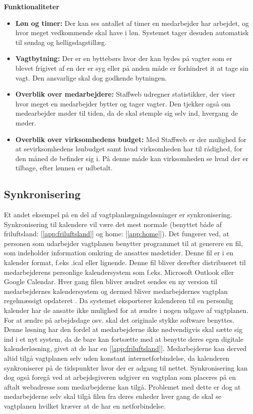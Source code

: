 \textbf{Funktionaliteter} 
\begin{itemize}
    \item {\textbf{Løn og timer:} Der kan ses antallet af timer en medarbejder har arbejdet, og hvor meget vedkommende skal have i løn. Systemet tager desuden automatisk til søndag og helligsdagstillæg.}
    \item {\textbf{Vagtbytning:} Der er en byttebørs hvor der kan bydes på vagter som er blevet frigivet af en der er syg eller på anden måde er forhindret it at tage sin vagt. Den ansvarlige skal dog godkende bytningen.}
    \item {\textbf{Overblik over medarbejdere:} Staffweb udregner statistikker, der viser hvor meget en medarbejder bytter og tager vagter. Den tjekker også om medearbejder møder til tiden, da de skal stemple sig selv ind, hvergang de møder.}
    \item {\textbf{Overblik over virksomhedens budget:} Med Staffweb er der mulighed for at sevirksomhedens lønbudget samt hvad virksomheden har til rådighed, for den måned de befinder sig i. På denne måde kan virksomheden se hvad der er tilbage, efter lønnen er udbetalt.}
\end{itemize}

\subsection{Synkronisering}
Et andet eksempel på en del af vagtplanlægningsløsninger er synkronisering. Synkronisering til kalendere vil være det mest normale (benyttet både af friluftsland: [\ref{app:friluftsland}] og home: [\ref{app:home}]). Det fungerer ved, at personen som udarbejder vagtplanen benytter programmet til at generere en fil, som indeholder information omkring de ansattes mødetider. Denne fil er i en kalender format, f.eks .ical eller lignende. Denne fil bliver derefter distribueret til medarbejderens personlige kalendersystem som f.eks. Microsoft Outlook eller Google Calendar. Hver gang filen bliver ændret sendes en ny version til medarbejdernes kalendersystem og dermed bliver medarbejdernes vagtplan regelmæssigt opdateret \citep{stage2005}. Da systemet eksporterer kalenderen til en personlig kalender har de ansatte ikke mulighed for at ændre i nogen udgave af vagtplanen. For at ændre på arbejdsdage osv. skal det originale stykke software benyttes. Denne løsning har den fordel at medarbejderne ikke nødvendigvis skal sætte sig ind i et nyt system, da de bare kan fortsætte med at benytte deres egen digitale kalenderløsning, givet at de har en [\ref{app:friluftsland}]. Medarbejderne kan derved altid tilgå vagtplanen selv uden konstant internetforbindelse, da kalenderen synkroniserer på de tidspunkter hvor der er adgang til nettet. Synkronisering kan dog også foregå ved at arbejdsgiveren udgiver en vagtplan som placeres på en aftalt webadresse som medarbejderne kan tilgå. Problemet med dette er dog at medarbejderne selv skal tilgå filen fra deres enheder hver gang de skal se vagtplanen hvilket kræver at de har en netforbindelse.\\

